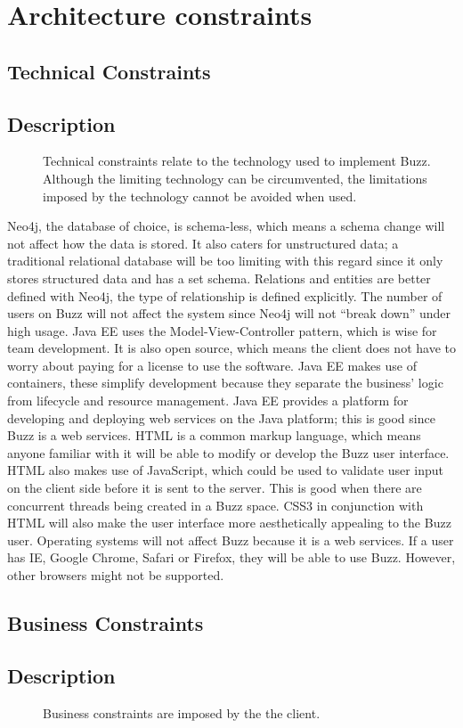 \documentclass{article}
\begin{document}
\section{Architecture constraints}
	\subsection{Technical Constraints}
	\subsection{Description}
	\begin{description}
		\item[] Technical constraints relate to the technology used to implement Buzz. Although the limiting technology can be circumvented, the limitations imposed by the technology cannot be avoided when used.
		\end{description}
		\newline
		Neo4j, the database of choice, is schema-less, which means a schema change will not affect how the data is stored. It also caters for unstructured data; a traditional relational database will be too limiting with this regard since it only stores structured data and has a set schema. Relations and entities are better defined with Neo4j, the type of relationship is defined explicitly. The number of users on Buzz will not affect the system since Neo4j will not “break down” under high usage.
     Java EE uses the Model-View-Controller pattern, which is wise for team development. It is also open source, which means the client does not have to worry about paying for a license to use the software. Java EE makes use of containers, these simplify development because they separate the business’  logic from lifecycle and resource management. Java EE provides a platform for developing and deploying web services on the Java platform; this is good since Buzz is a web services.
     HTML is a common markup language, which means anyone familiar with it will be able to modify or develop the Buzz user interface. HTML also makes use of JavaScript, which could be used to validate user input on the client side before it is sent to the server. This is good when there are concurrent threads being created in  a Buzz space. CSS3 in conjunction with HTML will also make the user interface more aesthetically appealing to the Buzz user. 
     Operating systems will not affect Buzz because it is a web services. If a user has IE, Google Chrome, Safari or Firefox, they will be able to use Buzz. However, other browsers might not be supported. 
     
  	\subsection{Business Constraints}
	\subsection{Description}
	\begin{description}
		\item[] Business constraints are imposed by the the client. 
		\end{description}
		
\end{document}
